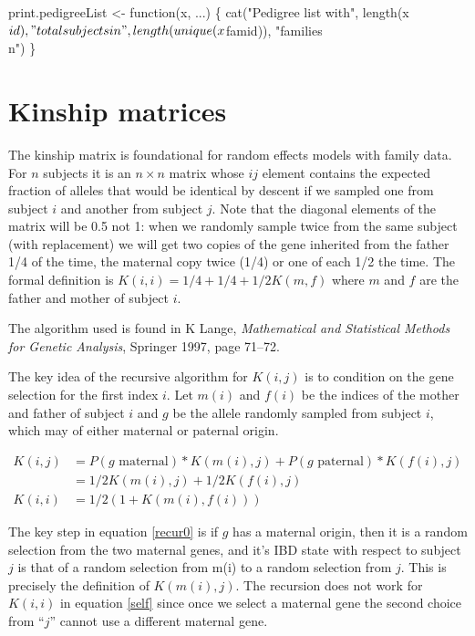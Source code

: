 \documentclass{article}
\begin{document}
print.pedigreeList <- function(x, ...) \{
    cat("Pedigree list with", length(x$id), "total subjects in",
        length(unique(x$famid)), "families\\n")
    \}
\nwendcode{}\nwdocspar
\section{Kinship matrices}
The kinship matrix is foundational for random effects models with family
data.  
For $n$ subjects it is an $n \times n$ matrix whose $ij$ element contains
the expected fraction of alleles that would be identical by descent
if we sampled one from subject $i$ and another from subject $j$.
Note that the diagonal elements of the matrix will be 0.5 not 1: when we
randomly sample twice from the same subject (with replacement) 
we will get two copies of the gene inherited from the father 1/4 of the
time, the maternal copy twice (1/4) or one of each 1/2 the time.
The formal definition is $K(i,i) = 1/4 + 1/4 + 1/2 K(m,f)$ where
$m$ and $f$ are the father and mother of subject $i$.

The algorithm used is found in K Lange, 
\emph{Mathematical and Statistical  Methods for Genetic Analysis}, 
Springer 1997, page 71--72.

The key idea of the recursive algorithm for $K(i,j)$ is to condition on
the gene selection for the first index $i$.
Let $m(i)$ and $f(i)$ be the indices of the mother and father of subject $i$
and $g$ be the allele randomly sampled from subject $i$,
which may of either maternal or paternal origin.


\begin{align}
  K(i,j) &= P(\mbox{$g$ maternal}) * K(m(i), j) + 
            P(\mbox{$g$ paternal}) * K(f(i), j) \label{recur0} \\
         &= 1/2 K(m(i), j) + 1/2 K(f(i), j)   \label{recur1} \\
  K(i,i) &= 1/2(1 + K(m(i), f(i))) \label{self} 
\end{align}

The key step in equation \eqref{recur0} is if $g$ has a maternal origin, then
it is a random selection from the two maternal genes, and it's IBD state with
respect to subject $j$ is that of a random selection from m(i) to a random
selection from $j$.  This is precisely the definition of $K(m(i), j)$.
The recursion does not work for $K(i,i)$ in equation \eqref{self} since once 
we select a maternal gene the second choice from ``$j$'' cannot use a 
different maternal gene.
\end{document}
